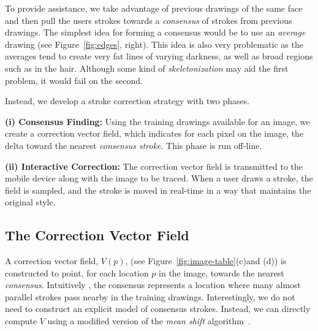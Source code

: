 To provide assistance, we take advantage of previous drawings of the same face and then pull the users strokes towards a {\em consensus} of strokes from previous drawings. The simplest idea for forming a consensus would be to use an {\em average} drawing (see Figure~\ref{fig:edges}, right). This idea is also very problematic as the averages tend to create very fat lines of varying darkness, as well as broad regions such as in the hair. Although some kind of {\em skeletonization} may aid the first problem, it would fail on the second.

Instead, we develop a stroke correction strategy with two phases.

\textbf{(i) Consensus Finding:} Using the training drawings available for an image, we create a correction vector field, which indicates for each pixel on the image, the delta toward the nearest {\em consensus stroke}.  This phase is run off-line.

\textbf{(ii) Interactive Correction:} The correction vector field is transmitted to the mobile device along with the image to be traced.  When a user draws a stroke, the field is sampled, and the stroke is moved in real-time in a way that maintains the original style.

\subsection{The Correction Vector Field}



A correction vector field, $V(p)$, (see Figure~\ref{fig:image-table}(c)and (d)) is constructed to point, for each location $p$ in the image, towards the nearest {\em consensus}. Intuitively , the consensus represents a location where many almost parallel strokes pass nearby in the training drawings. Interestingly, we do not need to construct an explicit model of consensus strokes. Instead, we can directly compute $V$ using a modified version of the {\em mean shift} algorithm~\cite{10.1109/ICCV.1999.790416}.


